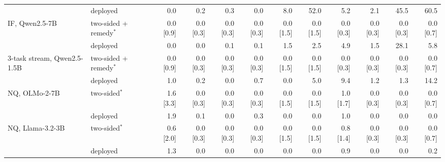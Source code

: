 \begin{table}[t]
\begin{tabular}{l l rrrrrrrrrr}
 & deployed & 0.0 & 0.2 & 0.3 & 0.0 & 8.0 & 52.0 & 5.2 & 2.1 & 45.5 & 60.5 \\
IF, Qwen2.5-7B & two-sided + remedy$^\ast$ & 0.0 [0.9] & 0.0 [0.3] & 0.0 [0.3] & 0.0 [0.3] & 0.0 [1.5] & 0.0 [1.5] & 0.0 [0.3] & 0.0 [0.3] & 0.0 [0.3] & 0.0 [0.7] \\
 & deployed & 0.0 & 0.0 & 0.1 & 0.1 & 1.5 & 2.5 & 4.9 & 1.5 & 28.1 & 5.8 \\
3-task stream, Qwen2.5-1.5B & two-sided + remedy$^\ast$ & 0.0 [0.9] & 0.0 [0.3] & 0.0 [0.3] & 0.0 [0.3] & 0.0 [1.5] & 0.0 [1.5] & 0.0 [0.3] & 0.0 [0.3] & 0.0 [0.3] & 0.0 [0.7] \\
 & deployed & 1.0 & 0.2 & 0.0 & 0.7 & 0.0 & 5.0 & 9.4 & 1.2 & 1.3 & 14.2 \\
NQ, OLMo-2-7B & two-sided$^\ast$ & 1.6 [3.3] & 0.0 [0.3] & 0.0 [0.3] & 0.0 [0.3] & 0.0 [1.5] & 0.0 [1.5] & 1.0 [1.7] & 0.0 [0.3] & 0.0 [0.3] & 0.0 [0.7] \\
 & deployed & 1.9 & 0.1 & 0.0 & 0.3 & 0.0 & 0.0 & 1.0 & 0.0 & 0.0 & 0.0 \\
NQ, Llama-3.2-3B & two-sided$^\ast$ & 0.6 [2.0] & 0.0 [0.3] & 0.0 [0.3] & 0.0 [0.3] & 0.0 [1.5] & 0.0 [1.5] & 0.8 [1.4] & 0.0 [0.3] & 0.0 [0.3] & 0.0 [0.7] \\
 & deployed & 1.3 & 0.0 & 0.0 & 0.0 & 0.0 & 0.0 & 0.9 & 0.0 & 0.0 & 0.2 \\
\bottomrule
\end{tabular}
\end{table}
